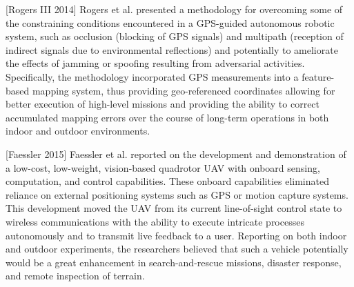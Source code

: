 [Rogers III 2014] Rogers et al. presented a methodology for overcoming some of the constraining conditions encountered in a GPS-guided autonomous robotic system, such as occlusion (blocking of GPS signals) and multipath (reception of indirect signals due to environmental reflections) and potentially to ameliorate the effects of jamming or spoofing resulting from adversarial activities. Specifically, the methodology incorporated GPS measurements into a feature-based mapping system, thus providing geo-referenced coordinates allowing for better execution of high-level missions and providing the ability to correct accumulated mapping errors over the course of long-term operations in both indoor and outdoor environments.

[Faessler 2015] Faessler et al. reported on the development and demonstration of a low-cost, low-weight, vision-based quadrotor UAV with onboard sensing, computation, and control capabilities. These onboard capabilities eliminated reliance on external positioning systems such as GPS or motion capture systems. This development moved the UAV from its current line-of-sight control state to wireless communications with the ability to execute intricate processes autonomously and to transmit live feedback to a user. Reporting on both indoor and outdoor experiments, the researchers believed that such a vehicle potentially would be a great enhancement in search-and-rescue missions, disaster response, and remote inspection of terrain. 
